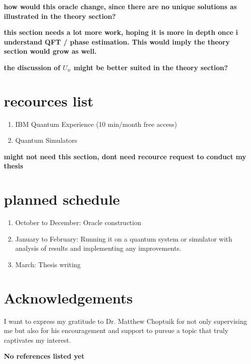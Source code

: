 \documentclass[twocolumn,showpacs,preprintnumbers,amsmath,amssymb]{revtex4}
\begin{document}
		\textbf{how would this oracle change, since there are no unique solutions as illustrated in the theory section?}
		
		\textbf{this section needs a lot more work, hoping it is more in depth once i understand QFT / phase estimation. This would imply the theory section would grow as well.}
	
		\textbf{the discussion of $U_w$ might be better suited in the theory section?}
		
		
		\section{recources list}
		\begin{enumerate}
			\item IBM Quantum Experience (10 min/month free access)
			\item Quantum Simulators
		\end{enumerate}
		
		\textbf{might not need this section, dont need recource request to conduct my thesis}
		\section{planned schedule}
		
		
		\begin{enumerate}
			\item October to December:  Oracle construction
			\item January to February:  Running it on a quantum system or simulator with analysis of results and implementing any improvements.
			\item  March: Thesis writing
		\end{enumerate}
		
		
		
		\section{Acknowledgements}
		
		I want to express my gratitude to Dr. Matthew Choptuik for not only supervising me but also 
		for his encouragement and support to pursue a topic that truly captivates my interest.
		
		\begin{thebibliography}{99}
			
			\textbf{No references listed yet}
			
		\end{thebibliography}
		
		
	
\end{document}
